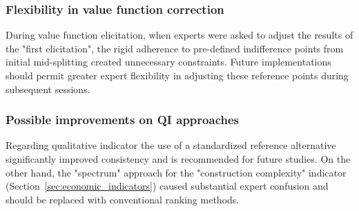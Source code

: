 \subsubsection{Flexibility in value function correction}
During value function elicitation, when experts were asked to adjust the results of the "first elicitation", the rigid adherence to pre-defined indifference points from initial mid-splitting created unnecessary constraints. Future implementations should permit greater expert flexibility in adjusting these reference points during subsequent sessions.

\subsubsection{Possible improvements on QI approaches}
Regarding qualitative indicator the use of a standardized reference alternative significantly improved consistency and is recommended for future studies. On the other hand, the "spectrum" approach for the "construction complexity" indicator (Section~\ref{sec:economic_indicators}) caused substantial expert confusion and should be replaced with conventional ranking methods.